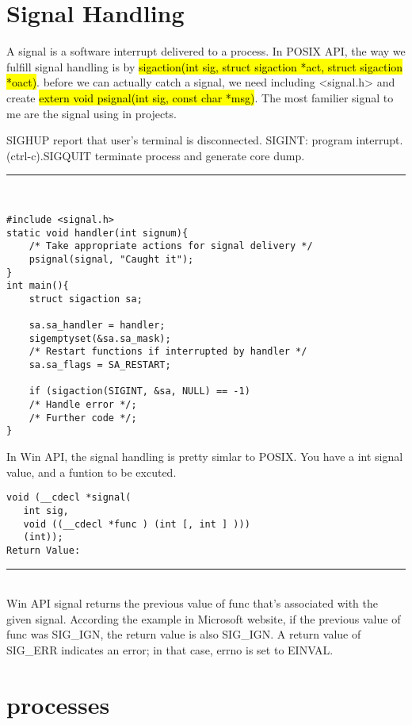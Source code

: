\documentclass[10pt,draftclsnofoot,onecolumn,journal,compsoc]{IEEEtran}
\begin{document}
\section*{Signal Handling}
A signal is a software interrupt delivered to a process. In POSIX API, the way we fulfill signal handling is by \hl{sigaction(int sig, struct sigaction *act, struct sigaction *oact)}. before we can actually catch a signal, we need including <signal.h> and create \hl{extern void psignal(int sig, const char *msg)}. The most familier signal to me are the signal using in projects.\par
SIGHUP report that user's terminal is disconnected. SIGINT: program interrupt. (ctrl-c).SIGQUIT terminate process and generate core dump.\\
\noindent\rule{15.5cm}{0.4pt}\\
\begin{verbatim}
#include <signal.h>
static void handler(int signum){
    /* Take appropriate actions for signal delivery */ 
    psignal(signal, "Caught it"); 
} 
int main(){ 
    struct sigaction sa; 
	 
    sa.sa_handler = handler; 
    sigemptyset(&sa.sa_mask); 
    /* Restart functions if interrupted by handler */ 
    sa.sa_flags = SA_RESTART;  
	 
    if (sigaction(SIGINT, &sa, NULL) == -1) 
    /* Handle error */; 
    /* Further code */; 
} 
\end{verbatim}
In Win API, the signal handling is pretty simlar to POSIX. You have a int signal value, and a funtion to be excuted.\par
\begin{verbatim}
void (__cdecl *signal(
   int sig, 
   void ((__cdecl *func ) (int [, int ] ))) 
   (int));
Return Value:
\end{verbatim}
\noindent\rule{15.5cm}{0.4pt}\\
Win API signal returns the previous value of func that's associated with the given signal. According the example in Microsoft website, if the previous value of func was SIG\_IGN, the return value is also SIG\_IGN. A return value of SIG\_ERR indicates an error; in that case, errno is set to EINVAL.\par
\section*{processes}
\end{document}
